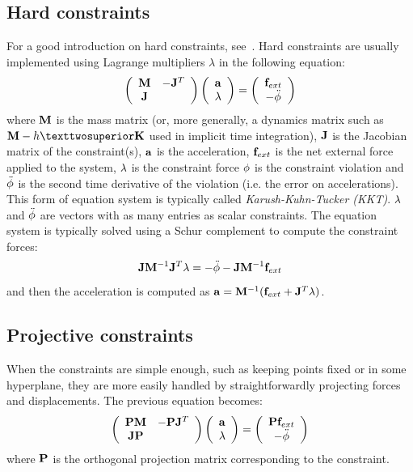 \subsection{Hard constraints}
For a good introduction on hard constraints, see~\cite{witkinconstraints}.
Hard constraints are usually implemented using Lagrange multipliers $\lambda$ in the following equation:
\begin{equation} \label{eq acc hard}
\left( \begin{array}{cc}
\M & -\Jt \\
 \J &  \end{array}\right)
\left( \begin{array}{c}
\acc \\ \lam
\end{array}\right) = \left( \begin{array}{c}
\forcext  \\
-\ddot \violation
\end{array}\right) 
\end{equation}
where $\M$ is the mass matrix (or, more generally, a dynamics matrix such as $\M-h²\K$ used in implicit time integration), $\J$ is the Jacobian matrix of the constraint(s), $\acc$ is the acceleration, $\forcext$ is the net external force applied to the system, $\lam$ is the constraint force $\violation$ is the constraint violation and $\ddot \violation$ is the second time derivative of the violation (i.e. the error on accelerations).
This form of equation system is typically called \textit{Karush-Kuhn-Tucker (KKT)}.
$\lam$ and $\ddot \violation$ are vectors with as many entries as scalar constraints. The equation system is typically solved using a Schur complement to compute the constraint forces:
\begin{equation}\label{eq schur rigid}
\J \Minv \Jt \lam = -\ddot \violation - \J \Minv \forcext
\end{equation}
and then the acceleration is computed as $\acc = \Minv( \forcext + \Jt \lam)$.

\subsection{Projective constraints}
When the constraints are simple enough, such as keeping points fixed or in some hyperplane, they are more easily handled by straightforwardly projecting forces and displacements.
The previous equation becomes:
\begin{equation} \label{eq acc hard projected}
\left( \begin{array}{cc}
\P\M & -\P\Jt \\
 \J\P &  \end{array}\right)
\left( \begin{array}{c}
\acc \\ \lam
\end{array}\right) = \left( \begin{array}{c}
\P\forcext  \\
-\ddot \violation
\end{array}\right) 
\end{equation}
 where $\P$ is the orthogonal projection matrix corresponding to the constraint.

